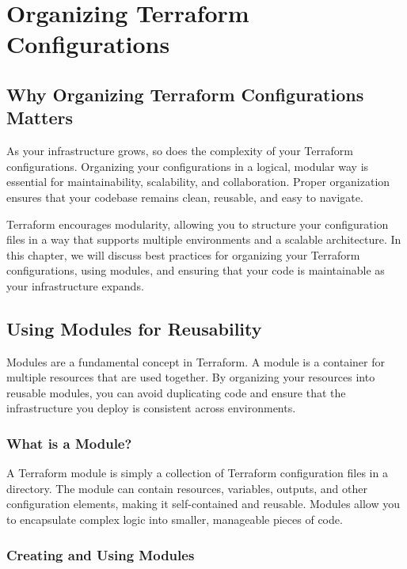 \chapter{Organizing Terraform Configurations}
\sloppy

\section{Why Organizing Terraform Configurations Matters}

As your infrastructure grows, so does the complexity of your Terraform configurations. Organizing your configurations in a logical, modular way is essential for maintainability, scalability, and collaboration. Proper organization ensures that your codebase remains clean, reusable, and easy to navigate.

Terraform encourages modularity, allowing you to structure your configuration files in a way that supports multiple environments and a scalable architecture. In this chapter, we will discuss best practices for organizing your Terraform configurations, using modules, and ensuring that your code is maintainable as your infrastructure expands.

\section{Using Modules for Reusability}

Modules are a fundamental concept in Terraform. A module is a container for multiple resources that are used together. By organizing your resources into reusable modules, you can avoid duplicating code and ensure that the infrastructure you deploy is consistent across environments.

\subsection{What is a Module?}

A Terraform module is simply a collection of Terraform configuration files in a directory. The module can contain resources, variables, outputs, and other configuration elements, making it self-contained and reusable. Modules allow you to encapsulate complex logic into smaller, manageable pieces of code.

\subsection{Creating and Using Modules}

